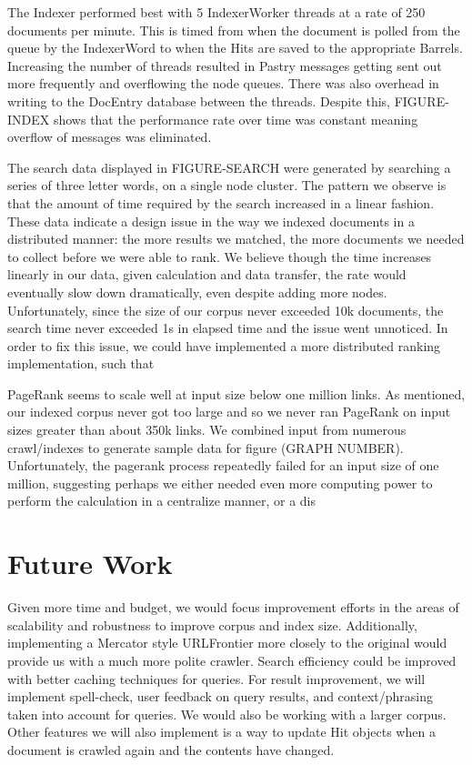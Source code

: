 \documentclass[11pt, letterpaper, oneside, twocolumn]{article}
\begin{document}
The Indexer performed best with 5 IndexerWorker threads at a rate of 250 documents per minute. 
This is timed from when the document is polled from the queue by the IndexerWord to when the Hits are saved to the appropriate Barrels. 
Increasing the number of threads resulted in Pastry messages getting sent out more frequently and overflowing the node queues. 
There was also overhead in writing to the DocEntry database between the threads. 
Despite this, FIGURE-INDEX shows that the performance rate over time was constant meaning overflow of messages was eliminated. 

The search data displayed in FIGURE-SEARCH were generated by searching a series of three letter words, on a single node cluster.
The pattern we observe is that the amount of time required by the search increased in a linear fashion.
These data indicate a design issue in the way we indexed documents in a distributed manner: the more results we matched, the more documents we needed to collect before we were able to rank.
We believe though the time increases linearly in our data, given calculation and data transfer, the rate would eventually slow down dramatically, even despite adding more nodes.
Unfortunately, since the size of our corpus never exceeded 10k documents, the search time never exceeded 1s in elapsed time and the issue went unnoticed.
In order to fix this issue, we could have implemented a more distributed ranking implementation, such that 

PageRank seems to scale well at input size below one million links.
As mentioned, our indexed corpus never got too large and so we never ran PageRank on input sizes greater than about 350k links.
We combined input from numerous crawl/indexes to generate sample data for figure (GRAPH NUMBER).
Unfortunately, the pagerank process repeatedly failed for an input size of one million, suggesting perhaps we either needed even more computing power to perform the calculation in a centralize manner, or a dis

\section{Future Work}
\label{sec:future}

Given more time and budget, we would focus improvement efforts in the areas of scalability and robustness to improve corpus and index size.
Additionally, implementing a Mercator style URLFrontier more closely to the original would provide us with a much more polite crawler. 
Search efficiency could be improved with better caching techniques for queries.
For result improvement, we will implement spell-check, user feedback on query results, and context/phrasing taken into account for queries. 
We would also be working with a larger corpus.
Other features we will also implement is a way to update Hit objects when a document is crawled again and the contents have changed.
\end{document}
